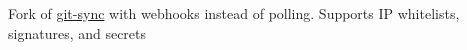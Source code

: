 {Fork of \href{https://github.com/kubernetes/git-sync}{git-sync} with webhooks instead of polling. Supports IP whitelists, signatures, and secrets}
